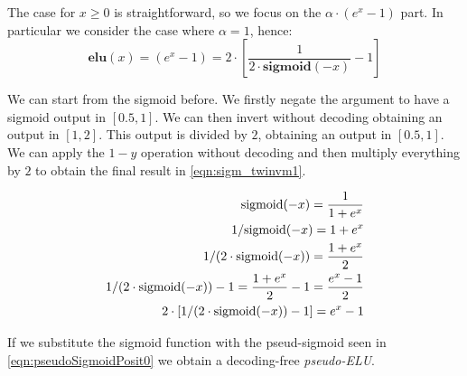 The case for $x \geq 0$ is straightforward, so we focus on the $\alpha \cdot (e^x - 1)$ part. In particular we consider the case where $\alpha = 1$, hence:
\begin{equation}
    \mathbf{elu}(x) = (e^x - 1) = 2 \cdot \left [ \frac{1}{2\cdot \mathbf{sigmoid}(-x)} - 1 \right]
\end{equation}

We can start from the sigmoid before. We firstly negate the argument to have a sigmoid output in $[0.5,1]$. We can then invert without decoding obtaining an output in $[1,2]$. This output is divided by $2$, obtaining an output in $[0.5,1]$. We can apply the $1-y$ operation without decoding and then multiply everything by $2$ to obtain the final result in \eqref{eqn:sigm_twinvm1}.

\begin{align}
   \label{eqn:sigm_mx}\textnormal{sigmoid}(-x) = \frac{1}{1+e^{x}}  & \\
   \label{eqn:sigm_invx}1/\textnormal{sigmoid}(-x) = 1+e^x & \\
   \label{eqn:sigm_invtw}1/(2\cdot\textnormal{sigmoid}(-x)) = \frac{1+e^x}{2}& \\
   \label{eqn:sigm_invm1}1/(2\cdot\textnormal{sigmoid}(-x))-1 = \frac{1+e^x}{2} - 1 = \frac{e^x-1}{2} & \\
  \label{eqn:sigm_twinvm1}2\cdot[1/(2\cdot\textnormal{sigmoid}(-x))-1] = e^x -1&
\end{align}

If we substitute the sigmoid function with the pseud-sigmoid seen in \eqref{eqn:pseudoSigmoidPosit0} we obtain a decoding-free \textit{pseudo-ELU}.